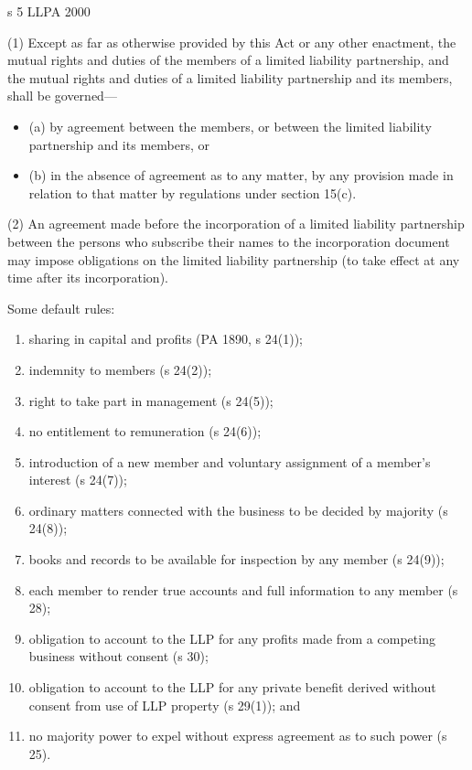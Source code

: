 \documentclass[
]{article}
\providecommand{\tightlist}{%
  \setlength{\itemsep}{0pt}\setlength{\parskip}{0pt}}
\newenvironment{env-83d04781-47bb-4a58-a80f-02aff522aa22}
{
    \savenotes\tcolorbox[blanker,breakable,left=5pt,borderline west={2pt}{-4pt}{green}]
}
{
    \endtcolorbox\spewnotes
}
\begin{document}
\begin{env-83d04781-47bb-4a58-a80f-02aff522aa22}

s 5 LLPA 2000

(1) Except as far as otherwise provided by this Act or any other
enactment, the mutual rights and duties of the members of a limited
liability partnership, and the mutual rights and duties of a limited
liability partnership and its members, shall be governed---

\begin{itemize}
\tightlist
\item
  (a) by agreement between the members, or between the limited liability
  partnership and its members, or
\item
  (b) in the absence of agreement as to any matter, by any provision
  made in relation to that matter by regulations under section 15(c).
\end{itemize}

(2) An agreement made before the incorporation of a limited liability
partnership between the persons who subscribe their names to the
incorporation document may impose obligations on the limited liability
partnership (to take effect at any time after its incorporation).

\end{env-83d04781-47bb-4a58-a80f-02aff522aa22}

Some default rules:

\begin{enumerate}
\tightlist
\item
  sharing in capital and profits (PA 1890, s 24(1));
\item
  indemnity to members (s 24(2));
\item
  right to take part in management (s 24(5));
\item
  no entitlement to remuneration (s 24(6));
\item
  introduction of a new member and voluntary assignment of a member's
  interest (s 24(7));
\item
  ordinary matters connected with the business to be decided by majority
  (s 24(8));
\item
  books and records to be available for inspection by any member (s
  24(9));
\item
  each member to render true accounts and full information to any member
  (s 28);
\item
  obligation to account to the LLP for any profits made from a competing
  business without consent (s 30);
\item
  obligation to account to the LLP for any private benefit derived
  without consent from use of LLP property (s 29(1)); and
\item
  no majority power to expel without express agreement as to such power
  (s 25).
\end{enumerate}
\end{document}
